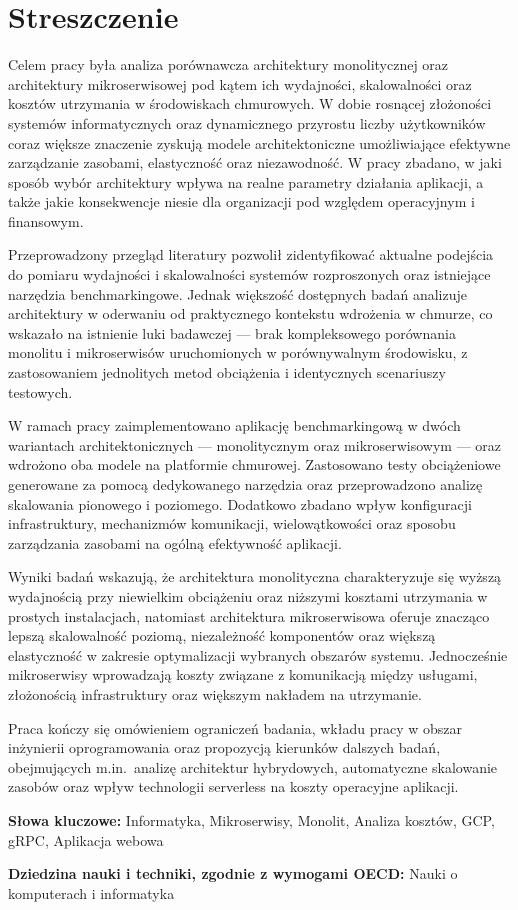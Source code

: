 \section*{Streszczenie}

Celem pracy była analiza porównawcza architektury monolitycznej oraz
architektury mikroserwisowej pod kątem ich wydajności, skalowalności
oraz kosztów utrzymania w środowiskach chmurowych. W dobie rosnącej
złożoności systemów informatycznych oraz dynamicznego przyrostu liczby
użytkowników coraz większe znaczenie zyskują modele architektoniczne
umożliwiające efektywne zarządzanie zasobami, elastyczność oraz
niezawodność. W pracy zbadano, w jaki sposób wybór architektury wpływa
na realne parametry działania aplikacji, a także jakie konsekwencje
niesie dla organizacji pod względem operacyjnym i finansowym.

Przeprowadzony przegląd literatury pozwolił zidentyfikować aktualne
podejścia do pomiaru wydajności i skalowalności systemów rozproszonych
oraz istniejące narzędzia benchmarkingowe. Jednak większość dostępnych
badań analizuje architektury w oderwaniu od praktycznego kontekstu
wdrożenia w chmurze, co wskazało na istnienie luki badawczej — brak
kompleksowego porównania monolitu i mikroserwisów uruchomionych w
porównywalnym środowisku, z zastosowaniem jednolitych metod obciążenia
i identycznych scenariuszy testowych.

W ramach pracy zaimplementowano aplikację benchmarkingową w dwóch
wariantach architektonicznych — monolitycznym oraz mikroserwisowym —
oraz wdrożono oba modele na platformie chmurowej. Zastosowano testy
obciążeniowe generowane za pomocą dedykowanego narzędzia oraz
przeprowadzono analizę skalowania pionowego i poziomego. Dodatkowo
zbadano wpływ konfiguracji infrastruktury, mechanizmów komunikacji,
wielowątkowości oraz sposobu zarządzania zasobami na ogólną
efektywność aplikacji.

Wyniki badań wskazują, że architektura monolityczna charakteryzuje się
wyższą wydajnością przy niewielkim obciążeniu oraz niższymi kosztami
utrzymania w prostych instalacjach, natomiast architektura
mikroserwisowa oferuje znacząco lepszą skalowalność poziomą,
niezależność komponentów oraz większą elastyczność w zakresie
optymalizacji wybranych obszarów systemu. Jednocześnie mikroserwisy
wprowadzają koszty związane z komunikacją między usługami,
złożonością infrastruktury oraz większym nakładem na utrzymanie.

Praca kończy się omówieniem ograniczeń badania, wkładu pracy w obszar
inżynierii oprogramowania oraz propozycją kierunków dalszych badań,
obejmujących m.in.\ analizę architektur hybrydowych,
automatyczne skalowanie zasobów oraz wpływ technologii serverless na
koszty operacyjne aplikacji.

\vspace{0.5cm}

\noindent \textbf{Słowa kluczowe:} Informatyka, Mikroserwisy, Monolit, Analiza kosztów, GCP, gRPC, Aplikacja webowa
\vspace{0.5cm}

\noindent \textbf{Dziedzina nauki i techniki, zgodnie z wymogami OECD:} Nauki o komputerach i informatyka
\vspace{0.5cm}